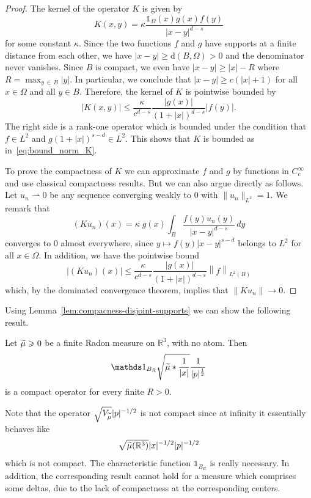 \documentclass[AHL,Unicode,published]{cedram}
\newcommand{\R}{\mathbb{R}}
\newcommand{\rmd}{\mathrm{d}}
\newcommand\1{{\ensuremath {\mathds 1} }}
\newcommand{\wto}{\rightharpoonup}
\newcommand{\ii}{\infty}
\newcommand{\norm}[1]{ \left\| #1 \right\|}
\renewcommand{\geq}{\geqslant}
\renewcommand{\leq}{\leqslant}
\renewcommand{\tilde}{\widetilde}
\let\oldtilde\tilde
\renewcommand*{\tilde}[1]{\mathchoice{\widetilde{#1}}{\widetilde{#1}}{\oldtilde{#1}}{\oldtilde{#1}}}
\begin{document}
\begin{proof}
The kernel of the operator $K$ is given by
\[
K(x,y)=\kappa\frac{\1_\Omega(x)g(x)f(y)}{|x-y|^{d-s}}
\]
for some constant $\kappa$. Since the two functions $f$ and $g$ have supports at a finite distance from each other, we have $|x-y|\geq \rmd(B,\Omega)>0$ and the denominator never vanishes. Since $B$ is compact, we even have $|x-y|\geq |x|-R$ where $R=\max_{y\,\in\,B}|y|$. In particular, we conclude that $|x-y|\geq c(|x|+1)$ for all $x\in \Omega$ and all $y\in B$. Therefore, the kernel of $K$ is pointwise bounded by
\[
\left|K(x,y)\right|\leq \frac{\kappa}{c^{d-s}}\frac{|g(x)|}{(1+|x|)^{d-s}}|f(y)|.
\]
The right side is a rank-one operator which is bounded under the condition that $f\in L^2$ and $g(1+|x|)^{s-d}\in L^2$. This shows that $K$ is bounded as in~\eqref{eq:bound_norm_K}.

To prove the compactness of $K$ we can approximate $f$ and $g$ by functions in $C^\ii_c$ and use classical compactness results. But we can also argue directly as follows. Let $u_n\wto0$ be any sequence converging weakly to 0 with $\|u_n\|_{L^2}=1$. We remark that
\[
(Ku_n)(x)=\kappa\;g(x)\int_{B}\frac{f(y)u_n(y)}{|x-y|^{d-s}}\,dy
\]
converges to 0 almost everywhere, since $y\mapsto f(y)|x-y|^{s-d}$ belongs to $L^2$ for all $x\in\Omega$. In addition, we have the pointwise bound
\[
\left|(Ku_n)(x)\right|\leq \frac{\kappa}{c^{d-s}}\frac{|g(x)|}{(1+|x|)^{d-s}}\norm{f}_{L^2(B)}
\]
which, by the dominated convergence theorem, implies that $\|Ku_n\|\to0$.
\end{proof}

Using Lemma~\ref{lem:compacness-disjoint-supports} we can show the following result.

\begin{lemm}\label{lem:compactness-no-atom}
Let $\tilde\mu\geq0$ be a finite Radon measure on $\R^3$, with no atom. Then
\[
\1_{B_R}\sqrt{\tilde\mu\ast\frac1{|x|}}\frac{1}{|p|^{\frac12}}
\]
is a compact operator for every finite $R>0$.
\end{lemm}

Note that the operator $\sqrt{V_{\tilde\mu}}|p|^{-1/2}$ is not compact since at infinity it essentially behaves like
\[
\sqrt{\tilde\mu(\R^3)}|x|^{-1/2}|p|^{-1/2}
\]
which is not compact. The characteristic function $\1_{B_R}$ is really necessary. In addition, the corresponding result cannot hold for a measure which comprises some deltas, due to the lack of compactness at the corresponding centers.
\end{document}
